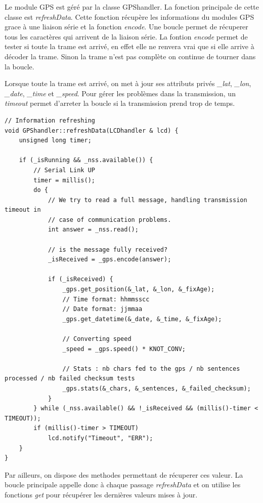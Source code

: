 \documentclass[a4paper,12pt,titlepage]{article}
\begin{document}
Le module GPS est géré par la classe GPShandler.
La fonction principale de cette classe est \emph{refreshData}.
Cette fonction récupère les informations du modules GPS grace à une liaison série et la fonction \emph{encode}.
Une boucle permet de récuperer tous les caractères qui arrivent de la liaison série.
La fontion \emph{encode} permet de tester si toute la trame est arrivé, en effet elle ne renvera vrai que si elle arrive à décoder la trame. Sinon la trame n'est pas complète on continue de tourner dans la boucle.

Lorsque toute la trame est arrivé, on met à jour ses attributs privés \emph{\_lat}, \emph{\_lon}, \emph{\_date}, \emph{\_time} et \emph{\_speed}.
Pour gérer les problèmes dans la transmission, un \emph{timeout} permet d'arreter la boucle si la transmission prend trop de temps.


\begin{lstlisting}[caption={resfreshData},label={refreshData}]
// Information refreshing
void GPShandler::refreshData(LCDhandler & lcd) {
    unsigned long timer;

    if (_isRunning && _nss.available()) {
        // Serial Link UP
        timer = millis();
        do {
            // We try to read a full message, handling transmission timeout in
            // case of communication problems.
            int answer = _nss.read();

            // is the message fully received?
            _isReceived = _gps.encode(answer);

            if (_isReceived) {
                _gps.get_position(&_lat, &_lon, &_fixAge);
                // Time format: hhmmsscc
                // Date format: jjmmaa
                _gps.get_datetime(&_date, &_time, &_fixAge);

                // Converting speed
                _speed = _gps.speed() * KNOT_CONV;

                // Stats : nb chars fed to the gps / nb sentences processed / nb failed checksum tests
                _gps.stats(&_chars, &_sentences, &_failed_checksum);
            }
        } while (_nss.available() && !_isReceived && (millis()-timer < TIMEOUT));
        if (millis()-timer > TIMEOUT)
            lcd.notify("Timeout", "ERR");
    }
}
\end{lstlisting}

Par ailleurs, on dispose des methodes permettant de récuperer ces valeur. La boucle principale appelle donc à chaque passage \emph{refreshData} et on utilise les fonctions \emph{get}
pour récupérer les dernières valeurs mises à jour.
\end{document}
